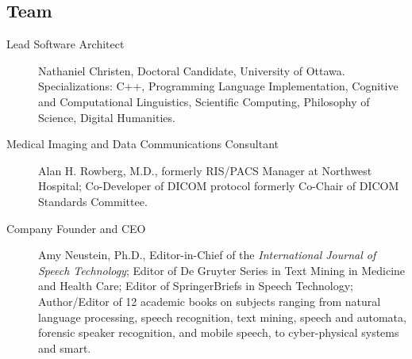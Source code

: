 
\begin{frame}{}
\section{Team}


\begin{center}
\begin{minipage}{0.84\textwidth}
{\LARGE \setlength{\leftmargini}{3pt}\begin{description}
\item[Lead Software Architect]  {\lsep} Nathaniel Christen, Doctoral Candidate, University of Ottawa.  
Specializations: C++, Programming Language 
Implementation, Cognitive and Computational 
Linguistics, Scientific Computing, Philosophy 
of Science, Digital Humanities.{\thrule}
\item[Medical Imaging and Data Communications Consultant]  {\lsep} Alan H. Rowberg, M.D., formerly
RIS/PACS Manager at Northwest Hospital; Co-Developer of DICOM protocol formerly Co-Chair
of DICOM Standards Committee.{\thrule}
\item[Company Founder and CEO]  {\lsep} Amy Neustein, Ph.D., Editor-in-Chief of the \textit{International Journal of
Speech Technology}; Editor of De Gruyter Series in Text Mining in Medicine and Health Care;
Editor of SpringerBriefs in Speech Technology; Author/Editor of 12 academic books on subjects
ranging from natural language processing, speech recognition, 
text mining, speech and
automata, forensic speaker recognition, 
and mobile speech, to cyber-physical systems 
and smart.\vspace{1em}  
\end{description}}
\end{minipage}
\end{center}


\end{frame}
